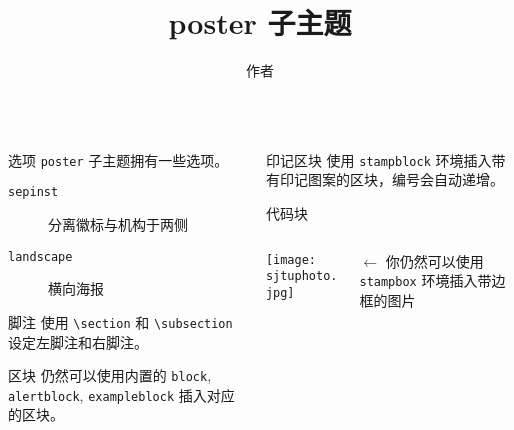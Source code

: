 \documentclass{ctexbeamer}
\begin{document}
  \title{poster 子主题}
  \author{作者}
  \logo{\zhlogo}
  \begin{frame}[fragile]
    \begin{columns}
      \begin{column}{0.45\textwidth}
        \begin{block}{选项}
          \texttt{poster} 子主题拥有一些选项。
          \begin{description}
            \item[\texttt{sepinst}] 分离徽标与机构于两侧
            \item[\texttt{landscape}] 横向海报 
          \end{description}
        \end{block}
        \begin{alertblock}{脚注}
          使用 \texttt{\textbackslash{}section} 和 \texttt{\textbackslash{}subsection} 设定左脚注和右脚注。
        \end{alertblock}
        \begin{exampleblock}{区块}
          仍然可以使用内置的 \texttt{block}, \texttt{alertblock}, \texttt{exampleblock} 插入对应的区块。
        \end{exampleblock}
      \end{column}
      \begin{column}{0.45\textwidth}
        
        \begin{stampblock}{印记区块}
          使用 \texttt{stampblock} 环境插入带有印记图案的区块，编号会自动递增。
        \end{stampblock}
        
        
        \begin{codeblock}[escapechar=|]{代码块}
        \end{codeblock}

        \begin{columns}[b]
          \begin{column}{.5\textwidth}
            \begin{stampbox}
              \texttt{[image: sjtuphoto.jpg]}
            \end{stampbox}
          \end{column}
          \begin{column}{.5\textwidth}
            $\leftarrow$ 你仍然可以使用 \texttt{stampbox} 环境插入带边框的图片\vspace{1ex}
          \end{column}
        \end{columns}
      \end{column}
    \end{columns}
  \end{frame}
\end{document}
